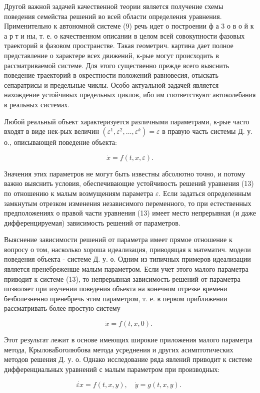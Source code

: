 \documentclass[10pt]{article}
\begin{document}
Другой важной задачей качественной теории является получение схемы поведения семейства решений во всей области определения уравнения. Применительно к автономной системе (9) речь идет о построении ф а 3 о в о й к а р т и ны, т. е. о качественном описании в целом всей совокупности фазовых траекторий в фазовом пространстве. Такая геометрич. картина дает полное представление о характере всех движений, к-рые могут происходить в рассматриваемой системе. Для этого существенно прежде всего выяснить поведение траекторий в окрестности положений равновесия, отыскать сепаратрисы и предельные чиклы. Особо актуальной задачей является нахождение устойчивых предельных циклов, ибо им соответствуют автоколебания в реальных системах.



Любой реальный объект характеризуется различными параметрами, к-рые часто входят в виде нек-рых величин $\left(\varepsilon^{1}, \varepsilon^{2}, \ldots, \varepsilon^{k}\right)=\varepsilon$ в правую часть системы Д. у. о., описывающей поведение объекта:



\[

\dot{x}=f(t, x, \varepsilon) .

\]



Значения этих параметров не могут быть известны абсолютно точно, и потому важно выяснить условия, обеспечивающие устойчивость решений уравнения (13) по отношению к малым возмущениям параметра $\varepsilon$. Если задаться определенным замкнутым отрезком изменения независимого переменного, то при естественных предположениях о правой части уравнения (13) имеет место непрерывная (и даже дифференцируемая) зависимость решений от параметров.



Выяснение зависимости решений от параметра имеет прямое отношение к вопросу о том, насколько хороша идеализация, приводящая к математич. модели поведения объекта - системе Д. у. о. Одним из типичных примеров идеализации является пренебреженше малым параметром. Если учет этого малого параметра приводит к системе (13), то непрерывная зависимость решений от параметра позволяет при изучении поведения объекта на конечном отрезке времени безболезненно пренебречь этим параметром, т. е. в первом приближении рассматривать более простую систему



\[

\dot{x}=f(t, x, 0) \text {. }

\]



Этот результат лежит в основе имеющих широкие приложения малого параметра метода, КрыловаБоголюбова метода усреднения и других асимптотических методов решения Д. у. о. Однако исследование ряда явлений приводит к системе дифференциальных уравнений с малым параметром при производных:



\[

\dot{\varepsilon x}=f(t, x, y), \quad \dot{y}=g(t, x, y) \text {. }

\]
\end{document}
